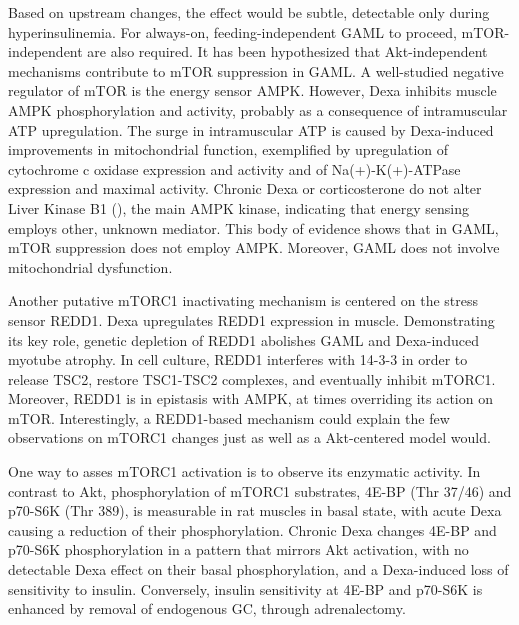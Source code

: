 \documentclass[12pt,english]{report}\usepackage[]{graphicx}\usepackage[]{color}
\begin{document}
Based on upstream changes, the effect would be subtle, detectable
only during hyperinsulinemia. For always-on, feeding-independent GAML
to proceed, mTOR-independent are also required. It has been hypothesized
that Akt-independent mechanisms contribute to mTOR suppression in
GAML. A well-studied negative regulator of mTOR is the energy sensor
AMPK\citep{koh2008lkb1,canto2010amp-activated}. However, Dexa inhibits
muscle AMPK phosphorylation and activity\citep{williams2012dietary,amaral2010opposite},
probably as a consequence of intramuscular ATP upregulation\citep{dumas2005dexamethasone}.
The surge in intramuscular ATP is caused by Dexa-induced improvements
in mitochondrial function, exemplified by upregulation of cytochrome
c oxidase expression and activity\citep{weber2002glucocorticoid}
and of Na(+)-K(+)-ATPase expression and maximal activity\citep{nordsborg2005dexamethasone}.
Chronic Dexa or corticosterone do not alter Liver Kinase B1 ()\citep{williams2012dietary,nakken2010effects},
the main AMPK kinase, indicating that energy sensing employs other,
unknown mediator. This body of evidence shows that in GAML, mTOR suppression
does not employ AMPK. Moreover, GAML does not involve mitochondrial
dysfunction.

Another putative mTORC1 inactivating mechanism is centered on the
stress sensor REDD1. Dexa upregulates REDD1 expression in muscle\citep{wu2010redd1}.
Demonstrating its key role, genetic depletion of REDD1 abolishes GAML
and Dexa-induced myotube atrophy\citep{wang2006dexamethasone,britto2014redd1}.
In cell culture, REDD1 interferes with 14-3-3 in order to release
TSC2, restore TSC1-TSC2 complexes, and eventually inhibit mTORC1\citep{deyoung2008hypoxia}.
Moreover, REDD1 is in epistasis with AMPK\citep{sofer2005regulation},
at times overriding its action on mTOR. Interestingly, a REDD1-based
mechanism could explain the few observations on mTORC1 changes just
as well as a Akt-centered model would.

One way to asses mTORC1 activation is to observe its enzymatic activity.
In contrast to Akt, phosphorylation of mTORC1 substrates, 4E-BP (Thr
37/46) and p70-S6K (Thr 389), is measurable in rat muscles in basal
state, with acute Dexa causing a reduction of their phosphorylation\citep{shah2000glucocorticoids}.
Chronic Dexa changes 4E-BP and p70-S6K phosphorylation in a pattern
that mirrors Akt activation, with no detectable Dexa effect on their
basal phosphorylation, and a Dexa-induced loss of sensitivity to insulin\citep{long2001dexamethasone,dardevet1999glucocorticoid-induced}.
Conversely, insulin sensitivity at 4E-BP and p70-S6K is enhanced by
removal of endogenous GC, through adrenalectomy\citep{long2003adrenalectomy,wu2004glucocorticoids}.
\end{document}
